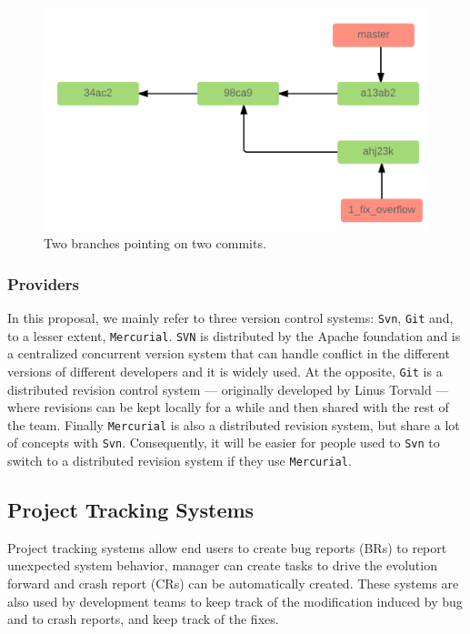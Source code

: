 \begin{figure}[h!]
  \centering
    \includegraphics[scale=0.25]{media/merge.png}
    \caption{Two branches pointing on two commits.
    \label{fig:merge}}
\end{figure}


\subsubsection{Providers\label{sec:revision-provider}}

In this proposal, we mainly refer to three version control systems: {\tt Svn}, {\tt Git} and, to a lesser extent, {\tt Mercurial}.
{\tt SVN} is distributed by the Apache foundation and is a centralized concurrent version system that can handle conflict in the different versions of different developers and it is widely used.
At the opposite, {\tt Git} is a distributed revision control system --- originally developed by Linus Torvald --- where revisions can be kept locally for a while and then shared with the rest of the team.
Finally {\tt Mercurial} is also a distributed revision system, but share a lot of concepts with {\tt Svn}.
Consequently, it will be easier for people used to {\tt Svn} to switch to a distributed revision system if they use {\tt Mercurial}.

\subsection{Project Tracking Systems\label{sec:issue-tracking}}

Project tracking systems allow end users to create bug reports (BRs) to report unexpected system behavior,
manager can create tasks to drive the evolution forward and crash report (CRs) can be automatically created.
These systems are also used by development teams to keep track of the modification induced by bug and to crash reports, and keep track of the fixes.



